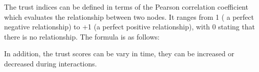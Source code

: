 The trust indices can be defined in terms of the Pearson correlation coefficient \cite{Leung2007} which evaluates the relationship between two nodes. It ranges from 1 ( a perfect negative relationship) to +1 (a perfect positive relationship), with 0 stating that there is no relationship. The formula is as follows:

In addition, the trust scores can be vary in time, they can be increased or decreased during interactions.
